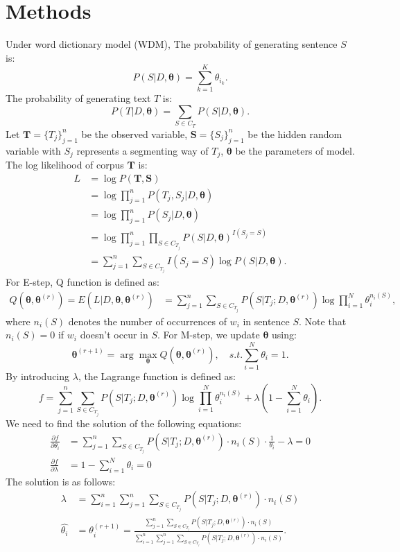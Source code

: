 \documentclass[12pt]{article}
\begin{document}
\section{Methods}
Under word dictionary model (WDM), The probability of generating sentence $S$ is:
$$ P(S|D, \bm{\theta}) = \sum_{k=1}^K \theta_{i_k}.$$
The probability of generating text $T$ is:
$$ P(T|D, \bm{\theta}) = \sum_{S \in C_T} P(S|D, \bm{\theta}). $$
Let $\bm{T} = \{T_j\}_{j=1}^n$ be the observed variable, $\bm{S} = \{S_j\}_{j=1}^n$ be the hidden random variable with $S_j$ represents a segmenting way of $T_j$, $\bm{\theta}$ be the parameters of model. The log likelihood of corpus $\bm{T}$ is:
\begin{align*}
L &= \log P(\bm{T}, \bm{S}) \\
&= \log \prod_{j=1}^n P(T_j, S_j | D, \bm{\theta}) \\
&= \log \prod_{j=1}^n P(S_j | D, \bm{\theta}) \\
&= \log \prod_{j=1}^n \prod_{S \in C_{T_j}} P(S|D, \bm{\theta})^{I(S_j = S)} \\
&= \sum_{j=1}^n \sum_{S \in C_{T_j}} I(S_j = S) \log P(S|D, \bm{\theta}).
\end{align*}
For E-step, Q function is defined as:
\begin{align*}
Q(\bm{\theta}, \bm{\theta}^{(r)}) = E(L|D, \bm{\theta}, \bm{\theta}^{(r)}) &= \sum_{j=1}^n \sum_{S \in C_{T_j}} P(S|T_j; D, \bm{\theta}^{(r)}) \log \prod_{i=1}^N \theta_i^{n_i(S)},
\end{align*}
where $n_i(S)$ denotes the number of occurrences of $w_i$ in sentence $S$. Note that $n_i(S) = 0$ if $w_i$ doesn't occur in $S$. For M-step, we update $\bm{\theta}$ using:
$$ \bm{\theta}^{(r+1)} = \arg \max_{\bm{\theta}} Q(\bm{\theta}, \bm{\theta}^{(r)}), \quad s.t. \sum_{i=1}^N \theta_i = 1. $$
By introducing $\lambda$, the Lagrange function is defined as:
$$ f = \sum_{j=1}^n \sum_{S \in C_{T_j}} P(S|T_j; D, \bm{\theta}^{(r)}) \log \prod_{i=1}^N \theta_i^{n_i(S)} + \lambda (1-\sum_{i=1}^N \theta_i). $$
We need to find the solution of the following equations:
\begin{align*}
\frac{\partial f}{\partial \theta_i} &= \sum_{j=1}^n \sum_{S \in C_{T_j}} P(S|T_j; D, \bm{\theta}^{(r)}) \cdot n_i(S) \cdot \frac{1}{\theta_i} - \lambda = 0 \\
\frac{\partial f}{\partial \lambda} &= 1 - \sum_{i=1}^N \theta_i = 0
\end{align*}
The solution is as follows:
\begin{align*}
\lambda &= \sum_{i=1}^n \sum_{j=1}^n \sum_{S \in C_{T_j}} P(S|T_j; D, \bm{\theta}^{(r)}) \cdot n_i(S) \\
\hat{\theta_i} &= \theta_i^{(r+1)} = \frac{\sum_{j=1}^n \sum_{S \in C_{T_j}} P(S|T_j; D, \bm{\theta}^{(r)}) \cdot n_i(S)}{\sum_{i=1}^n \sum_{j=1}^n \sum_{S \in C_{T_j}} P(S|T_j; D, \bm{\theta}^{(r)}) \cdot n_i(S)}.
\end{align*}
\end{document}
